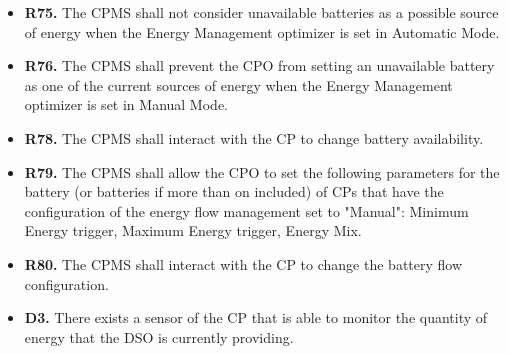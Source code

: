 \documentclass{Configuration_Files/PoliMi3i_thesis}
\begin{document}
\begin{enumerate}[label=\textbf{G\arabic*}]
\begin{itemize}
            \item \textbf{R75.} The CPMS shall not consider unavailable batteries as  a possible source of energy when the Energy Management optimizer is set in Automatic Mode.
            \item \textbf{R76.} The CPMS shall prevent the CPO from setting an unavailable battery as one of the current sources of energy when the Energy Management optimizer is set in Manual Mode.
            \item \textbf{R78.} The CPMS shall interact with the CP to change battery availability.
            \item \textbf{R79.} The CPMS shall allow the CPO to set the following  parameters for the battery (or batteries if more than on included) of CPs that have the configuration of the energy flow management set to  "Manual": Minimum Energy trigger, Maximum Energy trigger, Energy Mix.
            \item \textbf{R80.} The CPMS shall interact with the CP to change the battery flow configuration.
            \item \textbf{D3.} There exists a sensor of the CP that is able to monitor the quantity of energy that the DSO is currently providing.
        \end{itemize}


\end{enumerate}
\end{document}
